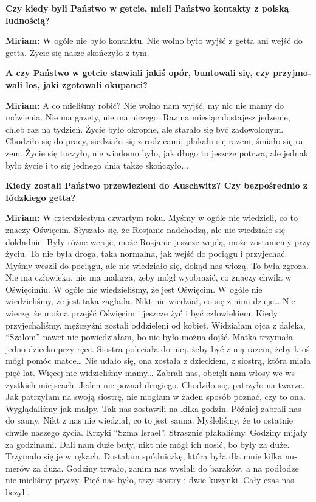 \begin{otherlanguage}{ngerman}
\textbf{Czy kiedy byli Państwo w getcie, mieli Państwo kontakty z polską ludnością?} 

\textbf{Miriam:} W ogóle nie było kontaktu. Nie wolno było wyjść z getta ani wejść do getta. Życie się nasze skończyło z tym.

\textbf{A czy Państwo w getcie stawiali jakiś opór, buntowali się, czy przyjmowali los, jaki zgotowali okupanci?} 

\textbf{Miriam:} A co mieliśmy robić? Nie wolno nam wyjść, my nic nie mamy do mówienia. Nie ma gazety, nie ma niczego. Raz na miesiąc dostajesz jedzenie, chleb raz na tydzień. Życie było okropne, ale starało się być zadowolonym. Chodziło się do pracy, siedziało się z rodzicami, płakało się razem, śmiało się razem. Życie się toczyło, nie wiadomo było, jak długo to jeszcze potrwa, ale jednak było życie i to się jednego dnia także skończyło... 

\textbf{Kiedy zostali Państwo przewiezieni do Auschwitz? Czy bezpośrednio z łódzkiego getta? }

\textbf{Miriam:} W czterdziestym czwartym roku. Myśmy w ogóle nie wiedzieli, co to znaczy Oświęcim. Słyszało się, że Rosjanie nadchodzą, ale nie wiedziało się dokładnie. Były różne wersje, może Rosjanie jeszcze wejdą, może zostaniemy przy życiu. To nie była droga, taka normalna, jak wejść do pociągu i przyjechać. Myśmy weszli do pociągu, ale nie wiedziało się, dokąd nas wiozą. To była zgroza. Nie ma człowieka, nie ma malarza, żeby mógł wyobrazić, co znaczy chwila w Oświęcimiu. W ogóle nie wiedzieliśmy, że jest Oświęcim. W ogóle nie wiedzieliśmy, że jest taka zagłada. Nikt nie wiedział, co się z nimi dzieje… Nie wierzę, że można przejść Oświęcim i jeszcze żyć i być człowiekiem. Kiedy przyjechaliśmy, mężczyźni zostali oddzieleni od kobiet. Widziałam ojca z daleka, "`Szalom"' nawet nie powiedziałam, bo nie było można dojść. Matka trzymała jedno dziecko przy ręce. Siostra poleciała do niej, żeby być z nią razem, żeby ktoś mógł pomóc matce… Nie udało się, ona została z dzieckiem, z siostrą, która miała pięć lat. Więcej nie widzieliśmy mamy… Zabrali nas, obcięli nam włosy we wszystkich miejscach. Jeden nie poznał drugiego. Chodziło się, patrzyło na twarze. Jak patrzyłam na swoją siostrę, nie mogłam w żaden sposób poznać, czy to ona. Wyglądaliśmy jak małpy. Tak nas zostawili na kilka godzin. Później zabrali nas do sauny. Nikt z nas nie wiedział, co to jest sauna. Myśleliśmy, że to ostatnie chwile naszego życia. Krzyki "`Szma Israel"'. Strasznie płakaliśmy. Godziny mijały za godzinami. Dali nam duże buty, nikt nie mógł ich nosić, bo były za duże. Trzymało się je w rękach. Dostałam spódniczkę, która była dla mnie kilka numerów za duża. Godziny trwało, zanim nas wysłali do baraków, a na podłodze nie mieliśmy pryczy. Pięć nas było, trzy siostry i dwie kuzynki. Cały czas nas liczyli. 


\end{otherlanguage}
